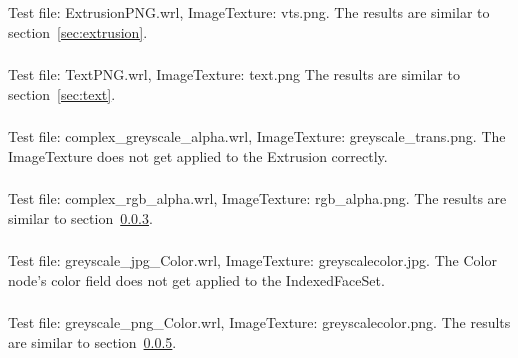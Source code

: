 \setcounter{subsubsection}{18}
\subsubsection{\ITS}
Test file: ExtrusionPNG.wrl, ImageTexture: vts.png.\newline
The results are similar to section~\ref{sec:extrusion}.

\subsubsection{\ITT}
Test file: TextPNG.wrl, ImageTexture: text.png\newline
The results are similar to section~\ref{sec:text}.

\setcounter{subsubsection}{21}
\subsubsection{\ITVa\ITVb}
\label{sec:png-complex-greyscale}
Test file: complex\_greyscale\_alpha.wrl, ImageTexture: greyscale\_trans.png.\newline
The ImageTexture does not get applied to the Extrusion correctly.

\setcounter{subsubsection}{23}
\subsubsection{\ITXa\ITXb}
\label{sec:complex-rgb-alpha}
Test file: complex\_rgb\_alpha.wrl, ImageTexture: rgb\_alpha.png.\newline
The results are similar to section~\ref{sec:png-complex-greyscale}.

\setcounter{subsubsection}{25}
\subsubsection{\ITZ}
\label{sec:greyscale-jpg-Color}
Test file: greyscale\_jpg\_Color.wrl, ImageTexture: greyscalecolor.jpg.\newline
The Color node's color field does not get applied to the IndexedFaceSet.

\setcounter{subsubsection}{27}
\subsubsection{\ITAB}
Test file: greyscale\_png\_Color.wrl, ImageTexture: greyscalecolor.png.\newline
The results are similar to section~\ref{sec:greyscale-jpg-Color}.

